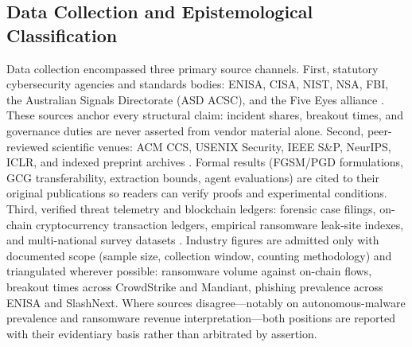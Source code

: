 \documentclass[conference,10pt,twocolumn,a4paper]{IEEEtran}
\begin{document}
\subsection{Data Collection and Epistemological Classification}
Data collection encompassed three primary source channels. First, statutory cybersecurity agencies and standards bodies: ENISA, CISA, NIST, NSA, FBI, the Australian Signals Directorate (ASD ACSC), and the Five Eyes alliance \cite{enisa_etl_2025, enisa_frontier_2026, cisa_agentic_ai_2026, nist_ir_8596_2025}. These sources anchor every structural claim: incident shares, breakout times, and governance duties are never asserted from vendor material alone. Second, peer-reviewed scientific venues: ACM CCS, USENIX Security, IEEE S\&P, NeurIPS, ICLR, and indexed preprint archives \cite{greshake2023indirect, zou2023universal, carlini2021extracting, fang2024llm, fang2024teams}. Formal results (FGSM/PGD formulations, GCG transferability, extraction bounds, agent evaluations) are cited to their original publications so readers can verify proofs and experimental conditions. Third, verified threat telemetry and blockchain ledgers: forensic case filings, on-chain cryptocurrency transaction ledgers, empirical ransomware leak-site indexes, and multi-national survey datasets \cite{chainalysis_crypto_crime_2026, blackkite_ransomware_2025, sophos_ransomware_2025, crowdstrike_gtr_2025}. Industry figures are admitted only with documented scope (sample size, collection window, counting methodology) and triangulated wherever possible: ransomware volume against on-chain flows, breakout times across CrowdStrike and Mandiant, phishing prevalence across ENISA and SlashNext. Where sources disagree---notably on autonomous-malware prevalence and ransomware revenue interpretation---both positions are reported with their evidentiary basis rather than arbitrated by assertion.
\end{document}
